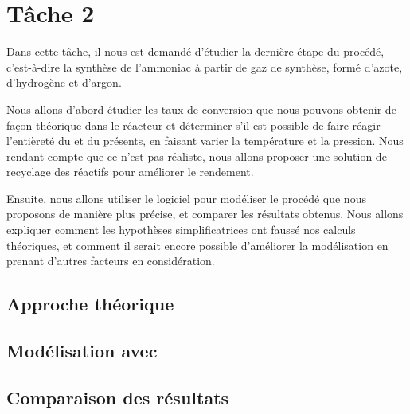 \chapter{Tâche 2}

Dans cette tâche, il nous est demandé d'étudier la dernière étape
du procédé, c'est-à-dire la synthèse de l'ammoniac à partir de
gaz de synthèse, formé d'azote, d'hydrogène et d'argon.

Nous allons d'abord étudier les taux de conversion que nous pouvons obtenir
de façon théorique
dans le réacteur et déterminer s'il est possible de faire réagir l'entièreté
du  et du  présents,
en faisant varier la température et la pression.
Nous rendant compte que ce n'est pas réaliste,
nous allons proposer une solution de recyclage des réactifs pour
améliorer le rendement.

Ensuite, nous allons utiliser le logiciel \aspen pour modéliser le procédé
que nous proposons de manière plus précise,
et comparer les résultats obtenus.
Nous allons expliquer comment les hypothèses simplificatrices
ont faussé nos calculs théoriques, et comment il serait encore possible
d'améliorer la modélisation en prenant d'autres facteurs en considération.

\section{Approche théorique}

\section{Modélisation avec \aspen}

\section{Comparaison des résultats}
